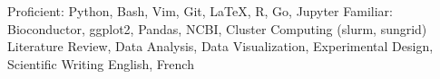 \begin{cvskills}
    	    {Proficient: Python, Bash, Vim, Git, LaTeX, R, Go, Jupyter}
	\cvskill{}
            {Familiar: Bioconductor, ggplot2, Pandas, NCBI, Cluster Computing (slurm, sungrid)}
            {Literature Review, Data Analysis, Data Visualization, Experimental Design, Scientific Writing}
		    {English, French}
\end{cvskills}
